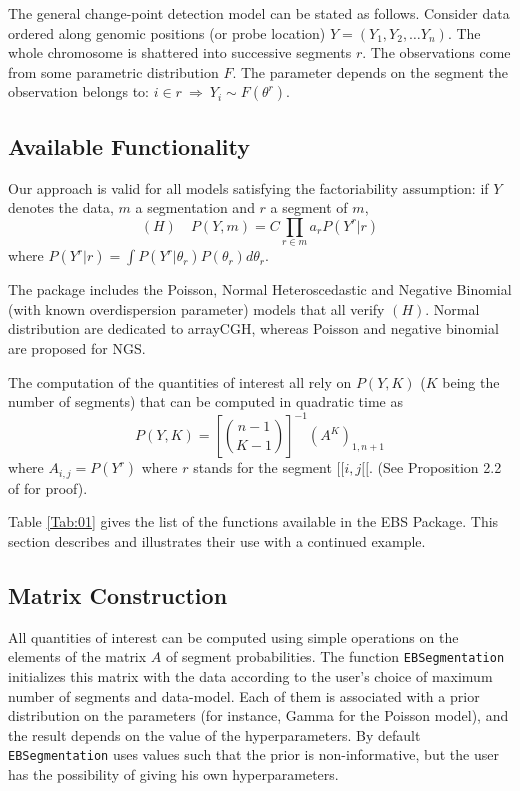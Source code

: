 \documentclass{bioinfo}
\begin{document}
The general change-point detection model can be stated as
  follows. Consider data ordered along genomic positions (or probe
  location) $Y = (Y_1, Y_2, \dots Y_n)$. The whole chromosome is
  shattered into successive segments $r$. The observations come from
  some parametric distribution $F$. The parameter depends on the
  segment the observation belongs to: $i \in r \: \Rightarrow \: Y_i
  \sim F(\theta^r)$.
\begin{methods}

\section{Available Functionality}
Our approach is valid for all models satisfying the factoriability
assumption: if $Y$ denotes the data, $m$ a segmentation and $r$ a
segment of $m$,
\begin{equation}
 (H)\quad P(Y,m) = C \prod_{r\in m} a_r P(Y^r|r) \label{factoriability}
\end{equation}
where $P(Y^r|r) =\int P(Y^r|\theta_r)P(\theta_r)d\theta_r $.

The
package includes the Poisson, Normal Heteroscedastic and Negative
Binomial (with known overdispersion parameter) models that all verify
$(H)$. Normal distribution are dedicated to arrayCGH, whereas Poisson and negative binomial are proposed for NGS.

The computation of the quantities of interest all rely on $P(Y,K)$
($K$ being the number of segments) that can be computed in quadratic
time as
\begin{equation}
 P(Y,K) = \left[{n-1} \choose{K-1} \right]^{-1} \left(A^K \right)_{1,n+1} \label{Proba}
\end{equation} 
where $A_{i,j}=P(Y^r)$ where $r$ stands for the segment $[\![i,j[\![$. (See Proposition 2.2 of \cite{rigaill_exact_2011} for proof).


Table \ref{Tab:01} gives the list of the functions available in the EBS Package. This section describes and illustrates their use with a continued example. 

\subsection{Matrix Construction}

All quantities of interest can be computed using simple operations on the elements of the matrix $A$ of segment probabilities. The function \texttt{EBSegmentation} initializes this matrix with the data according to the user's choice of maximum number of segments and data-model. Each of them is associated with a prior distribution on the parameters (for instance, Gamma for the Poisson model), and the result depends on the value of the hyperparameters. By default \texttt{EBSegmentation} uses values such that the prior is non-informative, but the user has the possibility of giving his own hyperparameters.


\end{methods}
\end{document}
